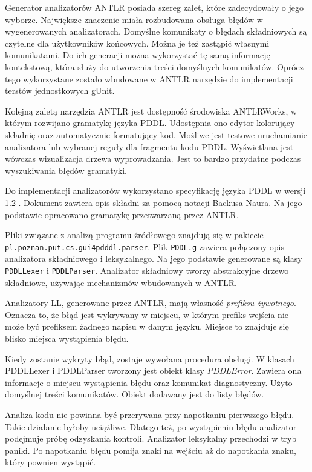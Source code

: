 Generator analizatorów ANTLR posiada szereg zalet, które zadecydowały o jego wyborze.
Największe znaczenie miała rozbudowana obsługa błędów w wygenerowanych analizatorach.
Domyślne komunikaty o błędach składniowych są czytelne dla użytkowników końcowych.
Można je też zastąpić własnymi komunikatami. Do ich generacji można wykorzystać tę samą 
informację kontekstową, która służy do utworzenia treści domyślnych komunikatów.
Oprócz tego wykorzystane zostało wbudowane w ANTLR narzędzie do implementacji
terstów jednostkowych gUnit.

Kolejną zaletą narzędzia ANTLR jest dostępność środowiska ANTLRWorks, w którym
rozwijano gramatykę języka PDDL. Udostępnia 
ono edytor kolorujący składnię oraz automatycznie formatujący kod. Możliwe jest
testowe uruchamianie analizatora lub wybranej reguły dla fragmentu kodu PDDL.
Wyświetlana jest wówczas wizualizacja drzewa wyprowadzania. Jest to bardzo przydatne
podczas wyszukiwania błędów gramatyki.

Do implementacji analizatorów wykorzystano specyfikację języka PDDL w wersji 1.2 \cite{pddl}.
Dokument zawiera opis składni za pomocą notacji Backusa-Naura. Na jego podstawie opracowano
gramatykę przetwarzaną przez ANTLR.

\begin{sloppypar}
Pliki związane z analizą programu źródłowego znajdują się w pakiecie 
\texttt{pl.poznan.put.cs.gui4pdddl.parser}.
Plik \texttt{PDDL.g} zawiera połączony opis analizatora
składniowego i leksykalnego.  %
Na jego podstawie generowane są klasy \texttt{PDDLLexer} i \texttt{PDDLParser}.
Analizator składniowy tworzy abstrakcyjne drzewo składniowe, używając mechanizmów
wbudowanych w ANTLR.
\end{sloppypar}


Analizatory LL, generowane przez ANTLR, mają własność \emph{prefiksu żywotnego}.
Oznacza to, że błąd jest wykrywany w miejscu, w którym prefiks wejścia nie może
być prefiksem żadnego napisu w danym języku. Miejsce to znajduje się blisko miejsca
wystąpienia błędu.

Kiedy zostanie wykryty błąd, zostaje wywołana procedura obsługi. W klasach 
PDDLLexer i PDDLParser tworzony jest obiekt klasy \emph{PDDLError}. Zawiera
ona informacje o miejscu wystąpienia błędu oraz komunikat diagnostyczny. Użyto
domyślnej treści komunikatów. Obiekt dodawany jest do listy błędów. 

Analiza kodu nie powinna być przerywana przy napotkaniu pierwszego błędu. Takie
działanie byłoby uciążliwe. Dlatego też, po wystąpieniu błędu analizator podejmuje
próbę odzyskania kontroli. Analizator leksykalny przechodzi w tryb paniki. Po napotkaniu 
błędu pomija znaki na wejściu aż do napotkania znaku, który pownien wystąpić.

